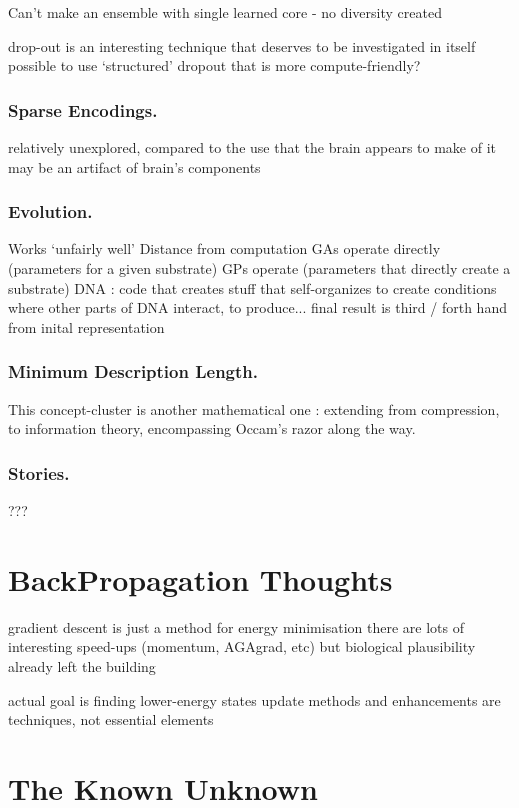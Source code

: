\documentclass[citeauthoryear]{llncs}
\begin{document}
Can't make an ensemble with single learned core - no diversity created

drop-out is an interesting technique that deserves to be investigated in itself
  possible to use `structured' dropout that is more compute-friendly?


\subsubsection*{Sparse Encodings.}
  relatively unexplored, compared to the use that the brain appears to make of it
    may be an artifact of brain's components
    
\subsubsection*{Evolution.}
  Works `unfairly well'
  Distance from computation
    GAs operate directly (parameters for a given substrate)
    GPs operate (parameters that directly create a substrate)
    DNA : code that creates stuff that self-organizes to create conditions where 
      other parts of DNA interact, to produce...   
        final result is third / forth hand from inital representation

\subsubsection*{Minimum Description Length.}
This concept-cluster is another mathematical one : extending from compression, to information theory,
encompassing Occam's razor along the way.

\subsubsection*{Stories.}
  ???
  

\section{BackPropagation Thoughts}
  gradient descent is just a method for energy minimisation
    there are lots of interesting speed-ups (momentum, AGAgrad, etc)
      but biological plausibility already left the building
      
    actual goal is finding lower-energy states
      update methods and enhancements are techniques, not essential elements


\section{The Known Unknown}
\end{document}
